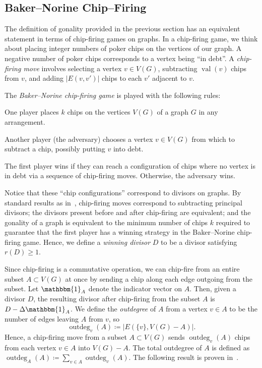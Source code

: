 \documentclass[10pt]{amsart}
\renewenvironment{enumerate}[1][]{\if\relax\detokenize{#1}\relax\sourceenumerate\else\sourceenumerate[label=#1]\fi}{\endsourceenumerate}
\DeclareMathOperator{\val}{val}
\DeclareMathOperator{\outdeg}{outdeg}
\begin{document}
\subsection{Baker--Norine Chip--Firing}

The definition of gonality provided in the previous section has an equivalent statement in terms of chip-firing games on graphs. In a chip-firing game, we think about placing integer numbers of poker chips on the vertices of our graph. A negative number of poker chips corresponds to a vertex being ``in debt''. A \emph{chip-firing move} involves selecting a vertex $v \in V(G)$, subtracting $\val (v)$ chips from $v$, and adding $|E(v,v')|$ chips to each $v'$ adjacent to $v$.

The \emph{Baker--Norine chip-firing game} is played with the following rules:

\begin{enumerate}
 \item\label{sect2.2_1} One player places $k$ chips on the vertices $V(G)$ of a graph $G$ in any arrangement.
 \item\label{sect2.2_2} Another player (the adversary) chooses a vertex $v \in V(G)$ from which to subtract a chip, possibly putting $v$ into debt.
 \item\label{sect2.2_3} The first player wins if they can reach a configuration of chips where no vertex is in debt via a sequence of chip-firing moves. Otherwise, the adversary wins.
\end{enumerate}

Notice that these ``chip configurations'' correspond to divisors on graphs. By standard results as in~\cite{bn}, chip-firing moves correspond to subtracting principal divisors; the divisors present before and after chip-firing are equivalent; and the gonality of a graph is equivalent to the minimum number of chips $k$ required to guarantee that the first player has a winning strategy in the Baker--Norine chip-firing game. Hence, we define a \emph{winning divisor} $D$ to be a divisor satisfying $r(D) \geq 1$. 

Since chip-firing is a commutative operation, we can chip-fire from an entire subset $A \subset V(G)$ at once by sending a chip along each edge outgoing from the subset. Let $\mathbbm{1}_A$ denote the indicator vector on $A$. Then, given a divisor $D$, the resulting divisor after chip-firing from the subset $A$ is $D - \Delta \mathbbm{1}_A$. We define the \emph{outdegree} of $A$ from a vertex $v \in A$ to be the number of edges leaving $A$ from $v$, so
\[
\outdeg _v(A) \coloneqq | E(\{v\}, V(G) - A) |.
\]
Hence, a chip-firing move from a subset $A \subset V(G)$ sends $\outdeg _v(A)$ chips from each vertex $v \in A$ into $V(G) - A$. The total outdegree of $A$ is defined as $\outdeg _A(A) \coloneqq \sum_{v \in A} \outdeg _v(A)$. The following result is proven in~\cite{db}.
\end{document}
